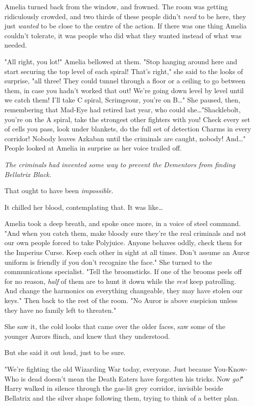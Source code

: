 Amelia turned back from the window, and frowned. The room was getting
ridiculously crowded, and two thirds of these people didn't \emph{need} to be
here, they just \emph{wanted} to be close to the centre of the action. If there
was one thing Amelia couldn't tolerate, it was people who did what they wanted
instead of what was needed.

"All right, you lot!" Amelia bellowed at them. "Stop hanging around here and
start securing the top level of each spiral! That's right," she said to the
looks of surprise, "all three! They could tunnel through a floor or a ceiling
to go between them, in case you hadn't worked that out! We're going down level
by level until we catch them! I'll take C spiral, Scrimgeour, you're on
B…" She paused, then, remembering that Mad-Eye had retired last year,
who could she…"Shacklebolt, you're on the A spiral, take the
strongest other fighters with you! Check every set of cells you pass, look under
blankets, do the full set of detection Charms in every corridor! Nobody leaves
Azkaban until the criminals are caught, nobody! And…" People looked at
Amelia in surprise as her voice trailed off.

\emph{The criminals had invented some way to prevent the Dementors from finding
Bellatrix Black.}

That ought to have been \emph{impossible.}

It chilled her blood, contemplating that. It was like…

Amelia took a deep breath, and spoke once more, in a voice of steel command.
"And when you catch them, make bloody sure they're the real criminals and not
our own people forced to take Polyjuice. Anyone behaves oddly, check them for
the Imperius Curse. Keep each other in sight at all times. Don't assume an
Auror uniform is friendly if you don't recognize the face." She turned to the
communications specialist. "Tell the broomsticks. If one of the brooms peels
off for no reason, \emph{half} of them are to hunt it down while the
\emph{rest} keep patrolling. And change the harmonics on everything changeable,
they may have stolen our keys." Then back to the rest of the room. "No Auror is
above suspicion unless they have no family left to threaten."

She saw it, the cold looks that came over the older faces, saw some of the
younger Aurors flinch, and knew that they understood.

But she said it out loud, just to be sure.

"We're fighting the old Wizarding War today, everyone. Just because
You-Know-Who is dead doesn't mean the Death Eaters have forgotten his tricks.
Now \emph{go!}"
\later
Harry walked in silence through the gas-lit grey corridor, invisible beside
Bellatrix and the silver shape following them, trying to think of a better plan.

